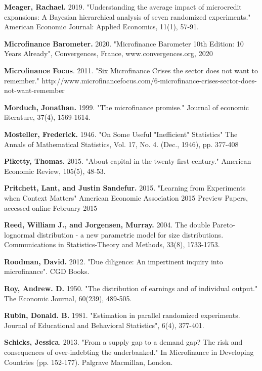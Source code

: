 \documentclass[AER]{AEA}
\begin{document}
\begin{thebibliography}{99}
 \textbf{ Meager, Rachael.} 2019. "Understanding the average impact of microcredit expansions: A Bayesian hierarchical analysis of seven randomized experiments." American Economic Journal: Applied Economics, 11(1), 57-91.

 \textbf{ Microfinance Barometer.} 2020. "Microfinance Barometer 10th Edition: 10 Years Already", Convergences, France, www.convergences.org, 2020

 \textbf{ Microfinance Focus}. 2011. "Six Microfinance Crises the sector does not want to remember." http://www.microfinancefocus.com/6-microfinance-crises-sector-does-not-want-remember

 \textbf{ Morduch, Jonathan.} 1999. "The microfinance promise." Journal of economic literature, 37(4), 1569-1614.

 \textbf{ Mosteller, Frederick.} 1946. "On Some Useful "Inefficient" Statistics" The Annals of Mathematical Statistics, Vol. 17, No. 4. (Dec., 1946), pp. 377-408

 \textbf{ Piketty, Thomas.} 2015. "About capital in the twenty-first century." American Economic Review, 105(5), 48-53.

 \textbf{ Pritchett, Lant, and Justin Sandefur.} 2015. "Learning from Experiments when Context Matters"  American Economic Association 2015 Preview Papers, accessed online February 2015

 \textbf{ Reed, William J., and Jorgensen, Murray.} 2004. The double Pareto-lognormal distribution - a new parametric model for size distributions. Communications in Statistics-Theory and Methods, 33(8), 1733-1753.

 \textbf{ Roodman, David.} 2012. "Due diligence: An impertinent inquiry into microfinance". CGD Books.

 \textbf{ Roy, Andrew. D.} 1950. "The distribution of earnings and of individual output." The Economic Journal, 60(239), 489-505.

 \textbf{ Rubin, Donald. B.} 1981. "Estimation in parallel randomized experiments. Journal of Educational and Behavioral Statistics", 6(4), 377-401.

 \textbf{ Schicks, Jessica}. 2013. "From a supply gap to a demand gap? The risk and consequences of over-indebting the underbanked." In Microfinance in Developing Countries (pp. 152-177). Palgrave Macmillan, London.


\end{thebibliography}
\end{document}
